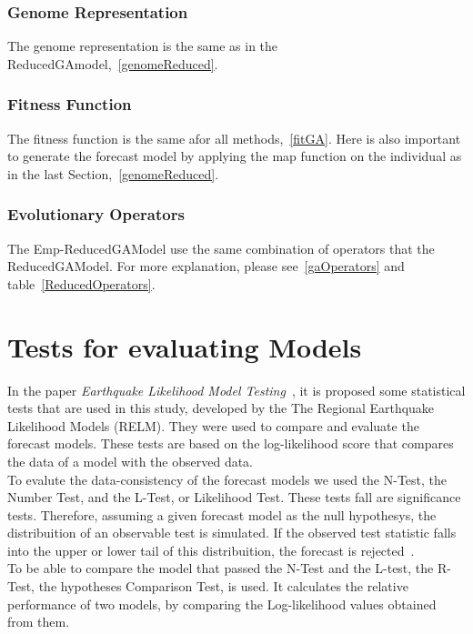 \subsubsection{Genome Representation}
The genome representation is the same as in the ReducedGAmodel,~\ref{genomeReduced}. \\

\subsubsection{Fitness Function}
The fitness function is the same afor all methods,~\ref{fitGA}. Here is also important to generate the forecast model by applying the map function on the individual as in the last Section,~\ref{genomeReduced}.\\

\subsubsection{Evolutionary Operators}
The Emp-ReducedGAModel use the same combination of operators that the ReducedGAModel. For more explanation, please see~\ref{gaOperators} and table~\ref{ReducedOperators}.\\

\section{Tests for evaluating Models}\label{Tests}

In the paper {\it Earthquake Likelihood Model Testing}~\cite{schorlemmer2007earthquake}, it is proposed some statistical tests that are used in this study, developed by the The Regional Earthquake Likelihood Models (RELM). They were used to compare and evaluate the forecast models. These tests are based on the log-likelihood score that compares the data of a model with the observed data.\\

To evalute the data-consistency of the forecast models we used the N-Test, the Number Test, and the L-Test, or Likelihood Test. These tests fall are significance tests. Therefore, assuming a given forecast model as the null hypothesys, the distribuition of an observable test is simulated. If the observed test statistic falls into the upper or lower tail of this distribuition, the forecast is
rejected~\cite{schorlemmer2010first}.\\

To be able to compare the model that passed the N-Test and the L-test, the R-Test, the hypotheses Comparison Test, is used. It calculates the relative performance of two models, by comparing the Log-likelihood values obtained from them.\\

